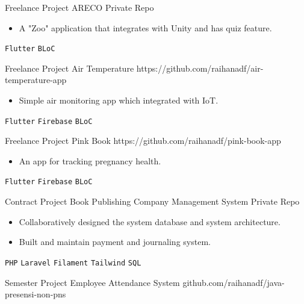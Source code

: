 \documentclass[9pt]{developercv} %
\begin{document}
\vspace{-10 pt}
\begin{entrylist}
	\entry
	{Freelance Project}
	{ARECO}
	{Private Repo}
	{
		\vspace{-10 pt}
		\begin{itemize}[noitemsep,topsep=0pt,parsep=0pt,partopsep=0pt, leftmargin=-1pt]
			\item {A "Zoo" application that integrates with Unity and has quiz feature.}
		\end{itemize}
		\texttt{Flutter} \slashsep \texttt{BLoC}
	}
	\entry
	{Freelance Project}
	{Air Temperature}
	{https://github.com/raihanadf/air-temperature-app}
	{
		\vspace{-10 pt}
		\begin{itemize}[noitemsep,topsep=0pt,parsep=0pt,partopsep=0pt, leftmargin=-1pt]
			\item {Simple air monitoring app which integrated with IoT.}
		\end{itemize}
		\texttt{Flutter} \slashsep \texttt{Firebase} \slashsep \texttt{BLoC}
	}
	\entry
	{Freelance Project}
	{Pink Book}
	{https://github.com/raihanadf/pink-book-app}
	{
		\vspace{-10 pt}
		\begin{itemize}[noitemsep,topsep=0pt,parsep=0pt,partopsep=0pt, leftmargin=-1pt]
			\item {An app for tracking pregnancy health.}
		\end{itemize}
		\texttt{Flutter} \slashsep \texttt{Firebase} \slashsep \texttt{BLoC}
	}
	\entry
	{Contract Project}
	{Book Publishing Company Management System}
	{Private Repo}
	{
		\vspace{-10 pt}
		\begin{itemize}[noitemsep,topsep=0pt,parsep=0pt,partopsep=0pt, leftmargin=-1pt]
			\item {Collaboratively designed the system database and system architecture.}
			\item {Built and maintain payment and journaling system.}
		\end{itemize}
		\texttt{PHP} \slashsep \texttt{Laravel} \slashsep \texttt{Filament} \slashsep \texttt{Tailwind} \slashsep \texttt{SQL}
	}
	\entry
	{Semester Project}
	{Employee Attendance System}
	{github.com/raihanadf/java-presensi-non-pns}
	{\vspace{-10 pt}
		\begin{itemize}[noitemsep,topsep=0pt,parsep=0pt,partopsep=0pt, leftmargin=-1pt]


\end{itemize}}
\end{entrylist}
\end{document}
